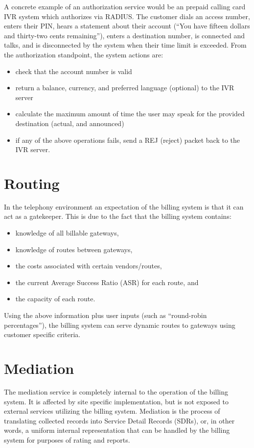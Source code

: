 		A concrete example of an authorization service would be an prepaid calling
		card IVR system which authorizes via RADIUS. The customer dials an access
		number, enters their PIN, hears a statement about their account (``You have
		fifteen dollars and thirty-two cents remaining''), enters a destination
		number, is connected and talks, and is disconnected by the system when
		their time limit is exceeded. From the authorization standpoint, the
		system actions are:
		\begin{itemize}
		  \item check that the account number is valid
		  \item return a balance, currency, and preferred language (optional) to the IVR server
		  \item calculate the maximum amount of time the user may speak for the provided destination (actual, and announced)
		  \item if any of the above operations fails, send a REJ (reject) packet back to the IVR server.
		\end{itemize}

	\section{Routing}
		In the telephony environment an expectation of the billing
		system is that it can act as a gatekeeper. This is due to the fact that
		the billing system contains:
		\begin{itemize}
		  \item knowledge of all billable gateways,
		  \item knowledge of routes between gateways,
		  \item the costs associated with certain vendors/routes,
		  \item the current Average Success Ratio (ASR) for each route, and
		  \item the capacity of each route.
		\end{itemize}

		Using the above information plus user inputs (such as ``round-robin
		percentages''), the billing system can serve dynamic routes to gateways
		using customer specific criteria.

	\section{Mediation}
		The mediation service is completely internal to the operation of the
		billing system. It is affected by site specific implementation, but is
		not exposed to external services utilizing the billing system. Mediation
		is the process of translating collected records into Service Detail
		Records (SDRs), or, in other words, a uniform internal representation
		that can be handled by the billing system for purposes of rating and
		reports.

